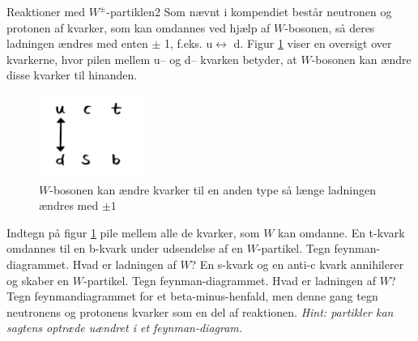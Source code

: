 \begin{opgave}{Reaktioner med $W^\pm$-partiklen}{2}
Som nævnt i kompendiet består neutronen og protonen af kvarker, som kan omdannes ved hjælp af $W$-bosonen, så deres ladningen ændres med enten $\pm$ 1, f.eks. u$\longleftrightarrow$ d. Figur \ref{fig:Wquarks} viser en oversigt over kvarkerne, hvor pilen mellem u-- og d-- kvarken betyder, at $W$-bosonen kan ændre disse kvarker til hinanden. 
\begin{figure}[h!]
  \centering
  \includegraphics[width=0.3\textwidth]{KernePartikel/Wquarks.png}
  \caption{$W$-bosonen kan ændre kvarker til en anden type så længe ladningen ændres med $\pm 1$}
  \label{fig:Wquarks}
\end{figure}
\opg Indtegn på figur \ref{fig:Wquarks} pile mellem alle de kvarker, som $W$ kan omdanne. 
\opg En t-kvark omdannes til en b-kvark under udsendelse af en $W$-partikel. Tegn feynman-diagrammet. Hvad er ladningen af $W$?
\opg En s-kvark og en anti-c kvark annihilerer og skaber en $W$-partikel. Tegn feynman-diagrammet. Hvad er ladningen af $W$?
\opg Tegn feynmandiagrammet for et beta-minus-henfald, men denne gang tegn neutronens og protonens kvarker som en del af reaktionen. \emph{Hint: partikler kan sagtens optræde uændret i et feynman-diagram.}
\end{opgave}

